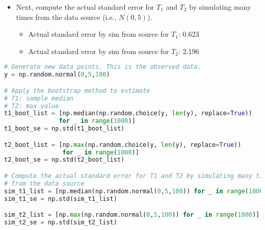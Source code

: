 \documentclass{article}
\begin{document}
\begin{enumerate}[label={(\alph*)}]
\begin{itemize}
            \item Next, compute the actual standard error for $T_1$ and $T_2$ by simulating
            many times from the data source (i.e., $N(0, 5)$).
            \begin{itemize}
                \item Actual standard error by sim from source for $T_1$: 0.623
                \item Actual standard error by sim from source for $T_2$: 2.196
            \end{itemize}
        \end{itemize}
\begin{lstlisting}[language=Python, caption=Bootstrap and Actual Standard Error]
# Generate new data points. This is the observed data.
y = np.random.normal(0,5,100)

# Apply the bootstrap method to estimate
# T1: sample median
# T2: max value
t1_boot_list = [np.median(np.random.choice(y, len(y), replace=True))
               for _ in range(1000)]
t1_boot_se = np.std(t1_boot_list)

t2_boot_list = [np.max(np.random.choice(y, len(y), replace=True))
                for _ in range(1000)]
t2_boot_se = np.std(t2_boot_list)

# Compute the actual standard error for T1 and T2 by simulating many times
# from the data source
sim_t1_list = [np.median(np.random.normal(0,5,100)) for _ in range(1000)]
sim_t1_se = np.std(sim_t1_list)

sim_t2_list = [np.max(np.random.normal(0,5,100)) for _ in range(1000)]
sim_t2_se = np.std(sim_t2_list)
\end{lstlisting}

\end{enumerate}
\pagebreak
\end{document}
